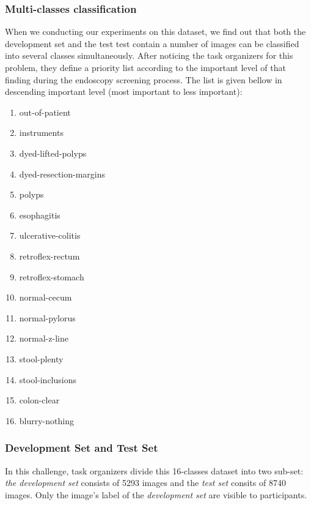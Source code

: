 \subsubsection*{Multi-classes classification}
When we conducting our experiments on this dataset, we find out that both the development set and the test test contain a number of images can be classified into several classes simultaneously. After noticing the task organizers for this problem, they define a priority list according to the important level of that finding during the endoscopy screening process. The list is given bellow in descending important level (most important to less important):

\begin{multicols}{3}
\begin{enumerate}
    \item out-of-patient
    \item instruments
    \item dyed-lifted-polyps
    \item dyed-resection-margins
    \item polyps
    \item esophagitis
    \item ulcerative-colitis
    \item retroflex-rectum
    \item retroflex-stomach
    \item normal-cecum
    \item normal-pylorus
    \item normal-z-line
    \item stool-plenty
    \item stool-inclusions
    \item colon-clear
    \item blurry-nothing
\end{enumerate}
\end{multicols}

\subsubsection*{Development Set and Test Set}
In this challenge, task organizers divide this 16-classes dataset into two sub-set: \textit{the development set} consists of 5293 images  and the  \textit{test set} consits of 8740 images. Only the image's label of the \textit{development set} are visible to participants.

